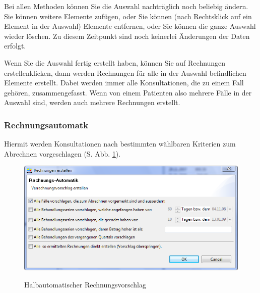 Bei allen Methoden können Sie die Auswahl nachträglich noch beliebig ändern. Sie
können weitere Elemente zufügen, oder Sie können (nach Rechtsklick auf ein
Element in der Auswahl) Elemente entfernen, oder Sie können die ganze Auswahl
wieder löschen. Zu diesem Zeitpunkt sind noch keinerlei Änderungen der Daten
erfolgt.

Wenn Sie die Auswahl fertig erstellt haben, können Sie auf \glqq Rechnungen
erstellen\grqq klicken, dann werden Rechnungen für alle in der Auswahl
befindlichen Elemente erstellt. Dabei werden immer alle Konsultationen, die zu
einem Fall gehören, zusammengefasst. Wenn von einem Patienten also mehrere Fälle
in der Auswahl sind, werden auch mehrere Rechnungen erstellt.

\subsubsection{Rechnungsautomatk}
\label{auto}
Hiermit werden Konsultationen nach bestimmten wählbaren Kriterien zum Abrechnen vorgeschlagen (S. Abb. \ref{fig:rnautomatik}).
\begin{figure}
  \includegraphics[width=1.0\textwidth]{images/rechnungsautomatik}\\
  \caption{Halbautomatischer Rechnungsvorschlag}\label{fig:rnautomatik}
\end{figure}

